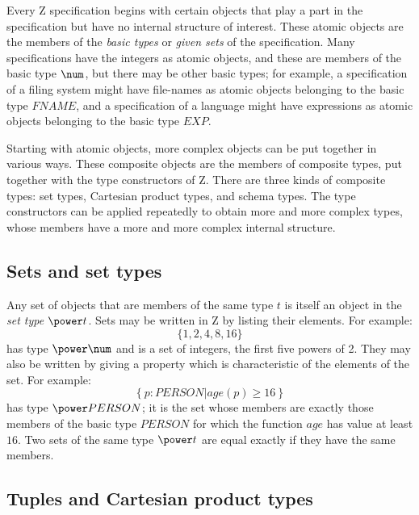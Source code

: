 Every Z specification begins with certain objects that play a
part in the specification but have no internal structure of interest.
These atomic objects are the members of the
{\em basic types\/}%
or {\em given sets\/} of the specification. Many
specifications have the integers as
atomic objects, and these are members of the basic type $\num$, but
there may be other basic types; for example, a specification of a
filing system might have file-names as atomic objects belonging to
the basic type $FNAME$, and a specification of a language might have
expressions as atomic objects belonging to the basic type $EXP$.

\new Starting with atomic objects, more complex objects can be put
together in various ways.  These composite objects are the members
of composite types, put together with the type
constructors of Z.  There are three kinds of
composite types: set types, Cartesian product types, and schema
types.  The type constructors can be applied repeatedly to obtain
more and more complex types, whose members have a more and more
complex internal structure.

\subsection{Sets and set types}

\new Any set of objects that are members of the same type $t$ is itself
an object in the {\em set type\/}%
\symdex{$\power$}%
$\power t$. Sets may be written in Z by listing their elements. For example:
\[ \{ 1, 2, 4, 8, 16 \} \]
has type $\power \num$ and is a set of integers, the first five
powers of 2.  They may also be written by giving a property which is
characteristic of the elements of the set.  For example:
\[ \{~p: PERSON | age(p) \geq 16~\} \]
has type $\power PERSON$; it is the set whose members are exactly
those members of the basic type $PERSON$ for which the function
$age$ has value at least $16$. Two sets of the same type
$\power t$ are equal exactly if they have the same members.

\subsection{Tuples and Cartesian product types}

